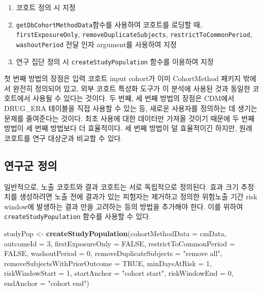 \documentclass[11pt]{book}
\newenvironment{Shaded}{\begin{snugshade}}{\end{snugshade}}
\newcommand{\KeywordTok}[1]{\textcolor[rgb]{0.13,0.29,0.53}{\textbf{#1}}}
\newcommand{\DataTypeTok}[1]{\textcolor[rgb]{0.13,0.29,0.53}{#1}}
\newcommand{\DecValTok}[1]{\textcolor[rgb]{0.00,0.00,0.81}{#1}}
\newcommand{\StringTok}[1]{\textcolor[rgb]{0.31,0.60,0.02}{#1}}
\newcommand{\OtherTok}[1]{\textcolor[rgb]{0.56,0.35,0.01}{#1}}
\newcommand{\NormalTok}[1]{#1}
\providecommand{\tightlist}{%
  \setlength{\itemsep}{0pt}\setlength{\parskip}{0pt}}
\theoremstyle{definition}
\theoremstyle{definition}
\theoremstyle{definition}
\theoremstyle{remark}
\begin{document}
\begin{enumerate}
\def\labelenumi{\arabic{enumi}.}
\tightlist
\item
  코호트 정의 시 지정
\item
  \texttt{getDbCohortMethodData}함수를 사용하여 코호트를 로딩할 때,
  \texttt{firstExposureOnly}, \texttt{removeDuplicateSubjects},
  \texttt{restrictToCommonPeriod}, \texttt{washoutPeriod} 전달 인자
  argument를 사용하여 지정
\item
  연구 집단 정의 시 \texttt{createStudyPopulation} 함수를 이용하여 지정
\end{enumerate}

첫 번째 방법의 장점은 입력 코호트 input cohort가 이미 CohortMethod
패키지 밖에서 완전히 정의되어 있고, 외부 코호트 특성화 도구가 이 분석에
사용된 것과 동일한 코호트에서 사용될 수 있다는 것이다. 두 번째, 세 번째
방법의 장점은 CDM에서 DRUG\_ERA 테이블을 직접 사용할 수 있는 등, 새로운
사용자를 정의하는 데 생기는 문제를 줄여준다는 것이다. 최초 사용에 대한
데이터만 가져올 것이기 때문에 두 번째 방법이 세 번째 방법보다 더
효율적이다. 세 번째 방법이 덜 효율적이긴 하지만, 원래 코호트를 연구
대상군과 비교할 수 있다.

\subsection{연구군 정의}\label{-}

일반적으로, 노출 코호트와 결과 코호트는 서로 독립적으로 정의된다. 효과
크기 추정치를 생성하려면 노출 전에 결과가 있는 피험자는 제거하고 정의한
위험노출 기간 risk window에 발생하는 결과 만을 고려하는 등의 방법을
추가해야 한다. 이를 위하여 \texttt{createStudyPopulation} 함수를 사용할
수 있다.

\begin{Shaded}
\begin{Highlighting}[]
\NormalTok{studyPop <-}\StringTok{ }\KeywordTok{createStudyPopulation}\NormalTok{(}\DataTypeTok{cohortMethodData =}\NormalTok{ cmData,}
                                  \DataTypeTok{outcomeId =} \DecValTok{3}\NormalTok{,}
                                  \DataTypeTok{firstExposureOnly =} \OtherTok{FALSE}\NormalTok{,}
                                  \DataTypeTok{restrictToCommonPeriod =} \OtherTok{FALSE}\NormalTok{,}
                                  \DataTypeTok{washoutPeriod =} \DecValTok{0}\NormalTok{,}
                                  \DataTypeTok{removeDuplicateSubjects =} \StringTok{"remove all"}\NormalTok{,}
                                  \DataTypeTok{removeSubjectsWithPriorOutcome =} \OtherTok{TRUE}\NormalTok{,}
                                  \DataTypeTok{minDaysAtRisk =} \DecValTok{1}\NormalTok{,}
                                  \DataTypeTok{riskWindowStart =} \DecValTok{1}\NormalTok{,}
                                  \DataTypeTok{startAnchor =} \StringTok{"cohort start"}\NormalTok{,}
                                  \DataTypeTok{riskWindowEnd =} \DecValTok{0}\NormalTok{,}
                                  \DataTypeTok{endAnchor =} \StringTok{"cohort end"}\NormalTok{)}
\end{Highlighting}
\end{Shaded}
\end{document}
